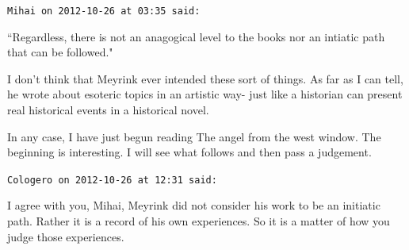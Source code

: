 \begin{footnotesize}\begin{sffamily}



\texttt{Mihai on 2012-10-26 at 03:35 said: }

``Regardless, there is not an anagogical level to the books nor an intiatic path that can be followed."

I don't think that Meyrink ever intended these sort of things. As far as I can tell, he wrote about esoteric topics in an artistic way- just like a historian can present real historical events in a historical novel.

In any case, I have just begun reading The angel from the west window. The beginning is interesting. I will see what follows and then pass a judgement.


\hfill

\texttt{Cologero on 2012-10-26 at 12:31 said: }

I agree with you, Mihai, Meyrink did not consider his work to be an initiatic path. Rather it is a record of his own experiences. So it is a matter of how you judge those experiences.


\end{sffamily}\end{footnotesize}
